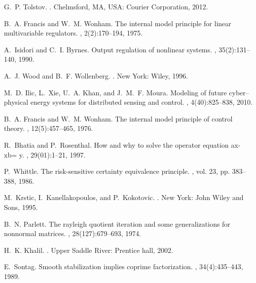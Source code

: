 \documentclass[journal]{IEEEtran}
\begin{document}
\begin{thebibliography}{10}
G.~P. Tolstov.
.
\newblock Chelmsford, MA, USA: Courier Corporation, 2012.

B.~A. Francis and W.~M. Wonham.
\newblock The internal model principle for linear multivariable regulators.
, 2(2):170--194, 1975.

A.~Isidori and C.~I. Byrnes.
\newblock Output regulation of nonlinear systems.
, 35(2):131--140, 1990.

A.~J. Wood and B.~F. Wollenberg.
.
\newblock New York: Wiley, 1996.

M.~D. Ilic, L.~Xie, U.~A. Khan, and J.~M.~F. Moura.
\newblock Modeling of future cyber--physical energy systems for distributed
  sensing and control.
, 4(40):825--838, 2010.

B.~A. Francis and W.~M. Wonham.
\newblock The internal model principle of control theory.
, 12(5):457--465, 1976.

R.~Bhatia and P.~Rosenthal.
\newblock How and why to solve the operator equation ax- xb= y.
, 29(01):1--21,
  1997.

P.~Whittle.
\newblock The risk-sensitive certainty equivalence principle.
, vol. 23, pp. 383--388, 1986.

M.~Krstic, I.~Kanellakopoulos, and P.~Kokotovic.
.
\newblock New York: John Wiley and Sons, 1995.

B.~N. Parlett.
\newblock The rayleigh quotient iteration and some generalizations for
  nonnormal matrices.
, 28(127):679--693, 1974.

H.~K. Khalil.
.
\newblock Upper Saddle River: Prentice hall, 2002.

E.~Sontag.
\newblock Smooth stabilization implies coprime factorization.
, 34(4):435--443, 1989.


\end{thebibliography}
\end{document}
